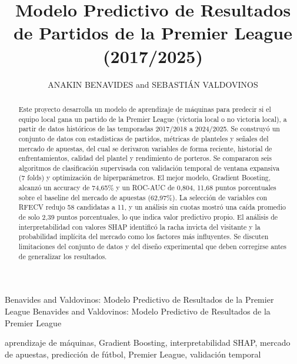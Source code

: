 \documentclass{ieeeaccess}
\begin{document}
\history{}
\doi{}

\title{Modelo Predictivo de Resultados de Partidos de la Premier League (2017/2025)}
\author{\uppercase{Anakin Benavides} and
\uppercase{Sebastián Valdovinos}}
\address[1]{Universidad Andrés Bello, Facultad de Ingeniería, Departamento de Ingeniería Civil Informática, Santiago, Chile}

\markboth
{Benavides and Valdovinos: Modelo Predictivo de Resultados de la Premier League}
{Benavides and Valdovinos: Modelo Predictivo de Resultados de la Premier League}


\begin{abstract}
Este proyecto desarrolla un modelo de aprendizaje de máquinas para predecir si el equipo local gana un partido de la Premier League (victoria local o no victoria local), a partir de datos históricos de las temporadas 2017/2018 a 2024/2025. Se construyó un conjunto de datos con estadísticas de partidos, métricas de planteles y señales del mercado de apuestas, del cual se derivaron variables de forma reciente, historial de enfrentamientos, calidad del plantel y rendimiento de porteros. Se compararon seis algoritmos de clasificación supervisada con validación temporal de ventana expansiva (7 folds) y optimización de hiperparámetros. El mejor modelo, Gradient Boosting, alcanzó un accuracy de 74,65\% y un ROC-AUC de 0,804, 11,68 puntos porcentuales sobre el baseline del mercado de apuestas (62,97\%). La selección de variables con RFECV redujo 58 candidatas a 11, y un análisis sin cuotas mostró una caída promedio de solo 2,39 puntos porcentuales, lo que indica valor predictivo propio. El análisis de interpretabilidad con valores SHAP identificó la racha invicta del visitante y la probabilidad implícita del mercado como los factores más influyentes. Se discuten limitaciones del conjunto de datos y del diseño experimental que deben corregirse antes de generalizar los resultados.
\end{abstract}

\begin{keywords}
aprendizaje de máquinas, Gradient Boosting, interpretabilidad SHAP, mercado de apuestas, predicción de fútbol, Premier League, validación temporal
\end{keywords}
\end{document}
